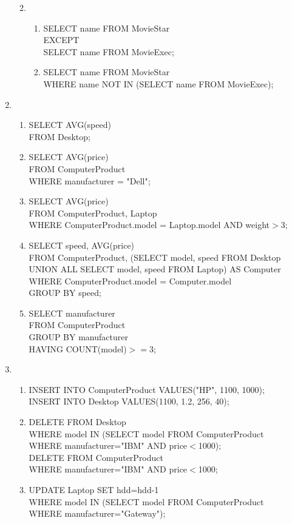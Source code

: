 \documentclass{article}
\begin{document}
\begin{enumerate}
\begin{enumerate}
\begin{enumerate}
                    \end{enumerate}
              \item
                    \begin{enumerate}
                        \item SELECT name FROM MovieStar\\EXCEPT\\SELECT name FROM MovieExec;
                        \item SELECT name FROM MovieStar\\WHERE name NOT IN (SELECT name FROM MovieExec);
                    \end{enumerate}
          \end{enumerate}
    \item
          \begin{enumerate}
              \item SELECT AVG(speed)\\FROM Desktop;
              \item SELECT AVG(price)\\FROM ComputerProduct\\WHERE manufacturer = "Dell";
              \item SELECT AVG(price)\\FROM ComputerProduct, Laptop\\WHERE ComputerProduct.model = Laptop.model AND weight$>$3;
              \item SELECT speed, AVG(price)\\FROM ComputerProduct, (SELECT model, speed FROM Desktop UNION ALL SELECT model, speed FROM Laptop) AS Computer\\WHERE ComputerProduct.model = Computer.model\\GROUP BY speed;
              \item SELECT manufacturer\\FROM ComputerProduct\\GROUP BY manufacturer\\HAVING COUNT(model)$>=$3;
          \end{enumerate}
    \item
          \begin{enumerate}
              \item INSERT INTO ComputerProduct VALUES("HP", 1100, 1000);\\INSERT INTO Desktop VALUES(1100, 1.2, 256, 40);
              \item DELETE FROM Desktop\\WHERE model IN (SELECT model FROM ComputerProduct\\WHERE manufacturer="IBM" AND price$<$1000);\\DELETE FROM ComputerProduct\\WHERE manufacturer="IBM" AND price$<$1000;
              \item UPDATE Laptop SET hdd=hdd-1\\WHERE model IN (SELECT model FROM ComputerProduct\\WHERE manufacturer="Gateway");
          \end{enumerate}
\end{enumerate}
\end{document}
